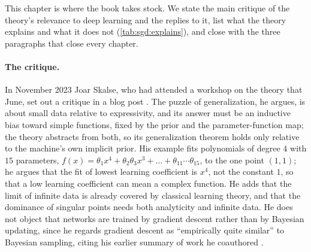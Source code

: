\begin{refsection}
This chapter is where the book takes stock. We state the main critique of the theory's relevance to deep learning and the replies to it, list what the theory explains and what it does not (\cref{tab:sgd:explains}), and close with the three paragraphs that close every chapter.


\paragraph{The critique.} In November 2023 Joar Skalse, who had attended a workshop on the theory that June, set out a critique in a blog post \parencite{Skalse2023}. The puzzle of generalization, he argues, is about small data relative to expressivity, and its answer must be an inductive bias toward simple functions, fixed by the prior and the parameter-function map; the theory abstracts from both, so its generalization theorem holds only relative to the machine's own implicit prior. His example fits polynomials of degree $4$ with $15$ parameters, $f(x)=\theta_1x^4+\theta_2\theta_3x^3+\dots+\theta_{11}\cdots\theta_{15}$, to the one point $(1,1)$; he argues that the fit of lowest learning coefficient is $x^4$, not the constant $1$, so that a low learning coefficient can mean a complex function. He adds that the limit of infinite data is already covered by classical learning theory, and that the dominance of singular points needs both analyticity and infinite data. He does not object that networks are trained by gradient descent rather than by Bayesian updating, since he regards gradient descent as ``empirically quite similar'' to Bayesian sampling, citing his earlier summary of work he coauthored \parencite{MingardEtAl2021}.


\end{refsection}
